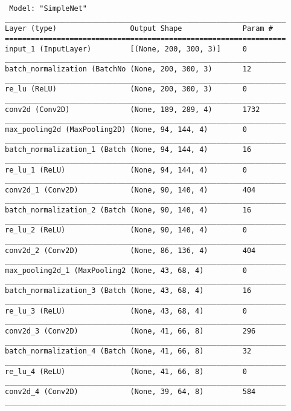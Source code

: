 \begin{verbatim}
 Model: "SimpleNet"
_________________________________________________________________
Layer (type)                 Output Shape              Param #   
=================================================================
input_1 (InputLayer)         [(None, 200, 300, 3)]     0         
_________________________________________________________________
batch_normalization (BatchNo (None, 200, 300, 3)       12        
_________________________________________________________________
re_lu (ReLU)                 (None, 200, 300, 3)       0         
_________________________________________________________________
conv2d (Conv2D)              (None, 189, 289, 4)       1732      
_________________________________________________________________
max_pooling2d (MaxPooling2D) (None, 94, 144, 4)        0         
_________________________________________________________________
batch_normalization_1 (Batch (None, 94, 144, 4)        16        
_________________________________________________________________
re_lu_1 (ReLU)               (None, 94, 144, 4)        0         
_________________________________________________________________
conv2d_1 (Conv2D)            (None, 90, 140, 4)        404       
_________________________________________________________________
batch_normalization_2 (Batch (None, 90, 140, 4)        16        
_________________________________________________________________
re_lu_2 (ReLU)               (None, 90, 140, 4)        0         
_________________________________________________________________
conv2d_2 (Conv2D)            (None, 86, 136, 4)        404       
_________________________________________________________________
max_pooling2d_1 (MaxPooling2 (None, 43, 68, 4)         0         
_________________________________________________________________
batch_normalization_3 (Batch (None, 43, 68, 4)         16        
_________________________________________________________________
re_lu_3 (ReLU)               (None, 43, 68, 4)         0         
_________________________________________________________________
conv2d_3 (Conv2D)            (None, 41, 66, 8)         296       
_________________________________________________________________
batch_normalization_4 (Batch (None, 41, 66, 8)         32        
_________________________________________________________________
re_lu_4 (ReLU)               (None, 41, 66, 8)         0         
_________________________________________________________________
conv2d_4 (Conv2D)            (None, 39, 64, 8)         584       
_________________________________________________________________

\end{verbatim}
